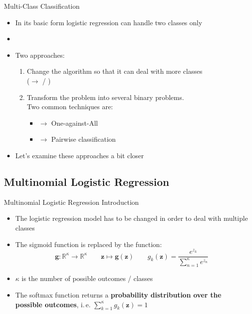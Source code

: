 \begin{frame}{Multi-Class Classification}{}
	\begin{itemize}
		\item In its basic form logistic regression can handle two classes only
		\item {}
		\item Two approaches:
		\begin{enumerate}
			\item Change the algorithm so that it can deal with more classes \\
				($\rightarrow$  / )
			\item Transform the problem into several binary problems. \\
				Two common techniques are:
			\begin{itemize}
				\item {} 	$\rightarrow$ One-against-All
				\item {} 	$\rightarrow$ Pairwise classification
			\end{itemize}
		\end{enumerate}
		\item Let's examine these approaches a bit closer
	\end{itemize}
\end{frame}


\subsection{Multinomial Logistic Regression}

\begin{frame}{Multinomial Logistic Regression Introduction}{}\optional
	\begin{itemize}
		\item The logistic regression model has to be changed in order to deal with multiple classes
		\item The sigmoid function is replaced by the  function:
		\begin{equation}
			\bm{g} : \mathbb{R}^{\kappa} \rightarrow \mathbb{R}^{\kappa} \qquad \bm{z} \mapsto \bm{g}(\bm{z}) \qquad
			g_k(\bm{z}) = \frac{e^{z_k}}{\sum_{n=1}^{\kappa} e^{z_n}}
		\end{equation}
		\item $\kappa$ is the number of possible outcomes / classes
		\item The softmax function returns a \textbf{probability distribution over the possible outcomes}, i.\,e. $\sum_{k=1}^{\kappa} g_k(\bm{z}) = 1$
	\end{itemize}
\end{frame}


